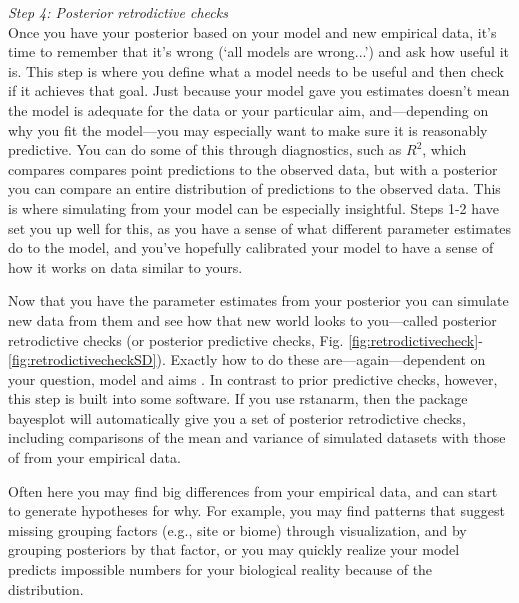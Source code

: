 \documentclass[11pt]{article}
\begin{document}
{\emph{Step 4: Posterior retrodictive checks} \\
Once you have your posterior based on your model and new empirical data, it's time to remember that it's wrong (`all models are wrong...') and ask how useful it is. This step is where you define what a model needs to be useful and then check if it achieves that goal. Just because your model gave you estimates doesn't mean the model is adequate for the data or your particular aim, and---depending on why you fit the model---you may especially want to make sure it is reasonably predictive. You can do some of this through diagnostics, such as $R^2$, which compares compares point predictions to the observed  data, but with a posterior you can compare an entire distribution of predictions to the observed data. This is where simulating from your model can be especially insightful. Steps 1-2 have set you up well for this, as you have a sense of what different parameter estimates do to the model, and you've hopefully calibrated your model to have a sense of how it works on data similar to yours.

Now that you have the parameter estimates from your posterior you can simulate new data from them and see how that new world looks to you---called posterior retrodictive checks (or posterior predictive checks, Fig. \ref{fig:retrodictivecheck}-\ref{fig:retrodictivecheckSD}). Exactly how to do these are---again---dependent on your question, model and aims \citep[but there is lots written on this,][]{held2010,gelman200ppc,conn2018}. In contrast to prior predictive checks, however, this step is built into some software. If you use \textsf{rstanarm}, then the package \textsf{bayesplot} will automatically give you a set of posterior retrodictive checks, including comparisons of the mean and variance of simulated datasets with those of from your empirical data. 

Often here you may find big differences from your empirical data, and can start to generate hypotheses for why. For example, you may find patterns that suggest missing grouping factors (e.g., site or biome) through visualization, and by grouping posteriors by that factor, or you may quickly realize your model predicts impossible numbers for your biological reality because of the distribution. 

}
\end{document}
